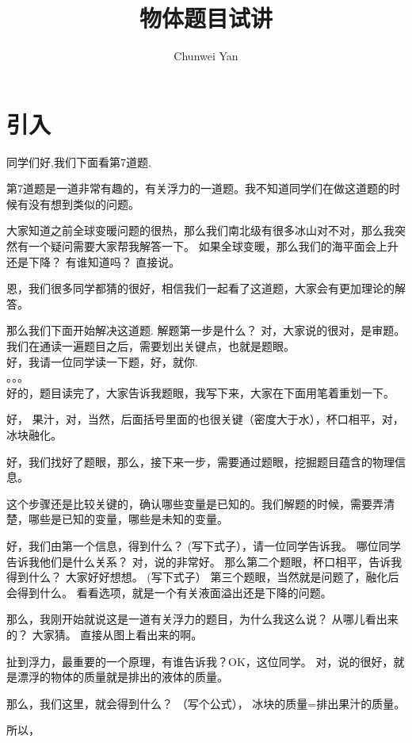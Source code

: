 \documentclass[a4paper]{ctexart}
\author{Chunwei Yan}
\title{物体题目试讲}
\begin{document}
    \maketitle
\section{引入}
同学们好,我们下面看第7道题.
\par
第7道题是一道非常有趣的，有关浮力的一道题。我不知道同学们在做这道题的时候有没有想到类似的问题。
\par
大家知道之前全球变暖问题的很热，那么我们南北级有很多冰山对不对，那么我突然有一个疑问需要大家帮我解答一下。 如果全球变暖，那么我们的海平面会上升还是下降？
有谁知道吗？ 直接说。 
\par
恩，我们很多同学都猜的很好，相信我们一起看了这道题，大家会有更加理论的解答。
\par
那么我们下面开始解决这道题. 解题第一步是什么？ 对，大家说的很对，是审题。 我们在通读一遍题目之后，需要划出关键点，也就是题眼。\\
好，我请一位同学读一下题，好，就你.\\
。。。\\
好的，题目读完了，大家告诉我题眼，我写下来，大家在下面用笔着重划一下。

好， 果汁，对，当然，后面括号里面的也很关键（密度大于水），杯口相平，对，冰块融化。

好，我们找好了题眼，那么，接下来一步，需要通过题眼，挖掘题目蕴含的物理信息。

这个步骤还是比较关键的，确认哪些变量是已知的。我们解题的时候，需要弄清楚，哪些是已知的变量，哪些是未知的变量。

好，我们由第一个信息，得到什么？ (写下式子），请一位同学告诉我。  哪位同学告诉我他们是什么关系？ 对，说的非常好。
那么第二个题眼，杯口相平，告诉我得到什么？ 大家好好想想。 (写下式子）
第三个题眼，当然就是问题了，融化后会得到什么。 看看选项，就是一个有关液面溢出还是下降的问题。

那么，我刚开始就说这是一道有关浮力的题目，为什么我这么说？ 从哪儿看出来的？ 大家猜。 直接从图上看出来的啊。 

扯到浮力，最重要的一个原理，有谁告诉我？OK，这位同学。 对，说的很好，就是漂浮的物体的质量就是排出的液体的质量。

那么，我们这里，就会得到什么？ （写个公式）， 冰块的质量=排出果汁的质量。

所以，
\end{document}
